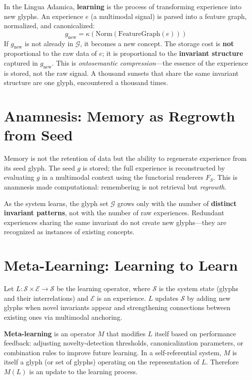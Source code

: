 \documentclass[12pt, letterpaper]{book}
\def\mathfrak#1{#1}%
\begin{document}
In the Lingua Adamica, \textbf{learning} is the process of transforming experience into new glyphs. An experience $e$ (a multimodal signal) is parsed into a feature graph, normalized, and canonicalized:
\[
\mathfrak{g}_{\mathrm{new}} = \kappa(\mathrm{Norm}(\mathrm{FeatureGraph}(e)))
\]
If $\mathfrak{g}_{\mathrm{new}}$ is not already in $\mathcal{G}$, it becomes a new concept. The storage cost is \textbf{not} proportional to the raw data of $e$; it is proportional to the \textbf{invariant structure} captured in $\mathfrak{g}_{\mathrm{new}}$. This is \textit{ontosemantic compression}---the essence of the experience is stored, not the raw signal. A thousand sunsets that share the same invariant structure are one glyph, encountered a thousand times.

\section{Anamnesis: Memory as Regrowth from Seed}

Memory is not the retention of data but the ability to regenerate experience from its seed glyph. The seed $\mathfrak{g}$ is stored; the full experience is reconstructed by evaluating $\mathfrak{g}$ in a multimodal context using the functorial renderers $F_S$. This is anamnesis made computational: remembering is not retrieval but \textit{regrowth}.

As the system learns, the glyph set $\mathcal{G}$ grows only with the number of \textbf{distinct invariant patterns}, not with the number of raw experiences. Redundant experiences sharing the same invariant do not create new glyphs---they are recognized as instances of existing concepts.

\section{Meta-Learning: Learning to Learn}

Let $L: \mathcal{S} \times \mathcal{E} \to \mathcal{S}$ be the learning operator, where $\mathcal{S}$ is the system state (glyphs and their interrelations) and $\mathcal{E}$ is an experience. $L$ updates $\mathcal{S}$ by adding new glyphs when novel invariants appear and strengthening connections between existing ones via multimodal anchoring.

\textbf{Meta-learning} is an operator $M$ that modifies $L$ itself based on performance feedback: adjusting novelty-detection thresholds, canonicalization parameters, or combination rules to improve future learning. In a self-referential system, $M$ is itself a glyph (or set of glyphs) operating on the representation of $L$. Therefore $M(L)$ is an update to the learning process.
\end{document}
